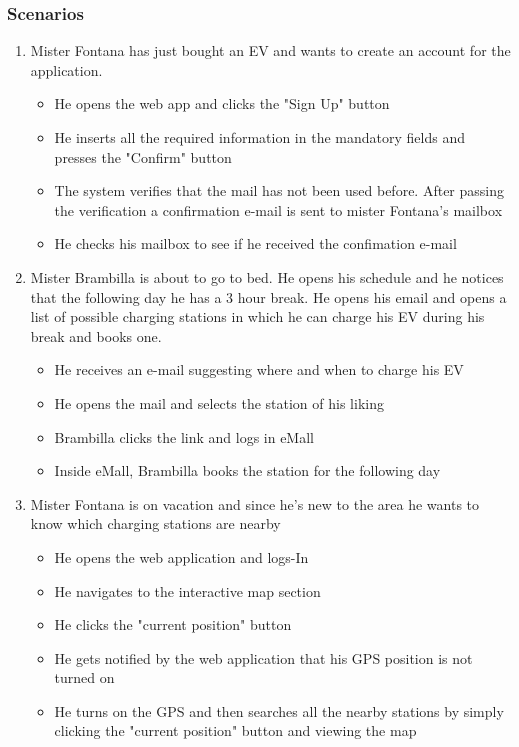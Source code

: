 \documentclass[table, 12pt]{article} %
\begin{document}
        \subsubsection{Scenarios}
        \label{scenarios}
            \begin{enumerate}
            
            \item Mister Fontana has just bought an EV and wants to create an account for the application.  
            \begin{itemize}
                \item He opens the web app and clicks the "Sign Up" button
                \item He inserts all the required information in the mandatory fields and presses the "Confirm" button
                \item The system verifies that the mail has not been used before. After passing the verification a confirmation e-mail is sent to mister Fontana's mailbox
                \item He checks his mailbox to see if he received the confimation e-mail
            \end{itemize}
                
            \item Mister Brambilla is about to go to bed. He opens his schedule and he notices that the following day he has a 3 hour break. He opens his email and opens a list of possible charging stations in which he can charge his EV during his break and books one.
            \begin{itemize}
                \item He receives an e-mail suggesting where and when to charge his EV 
                \item He opens the mail and selects the station of his liking
                \item Brambilla clicks the link and logs in eMall
                \item Inside eMall, Brambilla books the station for the following day
            \end{itemize}

            \item Mister Fontana is on vacation and since he's new to the area he wants to know which charging stations are nearby
            \begin{itemize}
                \item He opens the web application and logs-In
                \item He navigates to the interactive map section
                \item He clicks the "current position" button
                \item He gets notified by the web application that his GPS position is not turned on
                \item He turns on the GPS and then searches all the nearby stations by simply clicking the "current position" button and viewing the map 
                

\end{itemize}
\end{enumerate}
\end{document}

